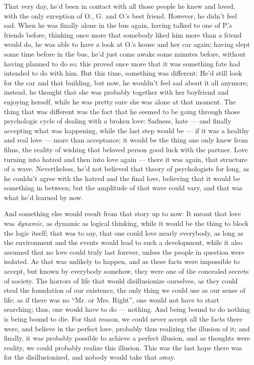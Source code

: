 That very day, he'd been in contact with all those people he knew and loved, with the only exception of O., G. and O.'s best friend. However, he didn't feel sad. When he was finally alone in the bus again, having talked to one of P.'s friends before, thinking once more that somebody liked him more than a friend would do, he was able to have a look at O.'s house and her car again; having slept some time before in the bus, he'd just come awake some minutes before, without having planned to do so; this proved once more that it was something fate had intended to do with him. But this time, something was different: He'd still look for the car and that building, but now, he wouldn't feel sad about it all anymore; instead, he thought that she was probably together with her boyfriend and enjoying herself, while he was pretty sure she was alone at that moment. The thing that was different was the fact that he seemed to be going through those psychologic cycle of dealing with a broken love: Sadness, hate --- and finally accepting what was happening, while the last step would be --- if it was a healthy and real love --- more than acceptance; it would be the thing one only knew from films, the reality of wishing that beloved person good luck with the partner. Love turning into hatred and then into love again --- there it was again, that structure of a wave. Nevertheless, he'd not believed that theory of psychologists for long, as he couldn't agree with the hatred and the final love, believing that it would be something in between; but the amplitude of that wave could vary, and that was what he'd learned by now.

And something else would result from that story up to now: It meant that love was \emph{dynamic}, as dynamic as logical thinking, while it would be the thing to block the logic itself; that was to say, that one could love nearly everybody, as long as the environment and the events would lead to such a development, while it also assumed that no love could truly last forever, unless the people in question were isolated. As that was unlikely to happen, and as these facts were impossible to accept, but known by everybody somehow, they were one of the concealed secrets of society. The horrors of life that would disillusionize ourselves, as they could steal the foundation of our existence, the only thing we could use as our sense of life; as if there was no \enquote{Mr. or Mrs. Right}, one would not have to start searching; thus, one would have to do --- nothing. And being bound to do nothing is being bound to die. For that reason, we could never accept all the facts there were, and believe in the perfect love, probably thus realizing the illusion of it; and finally, it was probably possible to achieve a perfect illusion, and as thoughts were reality, we could probably realize this illusion. This was the last hope there was for the disillusionized, and nobody would take that away.

